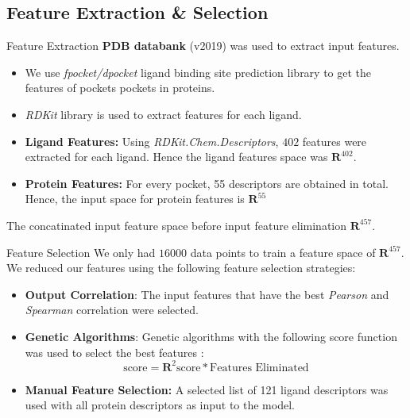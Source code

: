 \documentclass{beamer}
\begin{document}
\subsection{Feature Extraction \& Selection}

\begin{frame}[t]{Feature Extraction}
\textbf{PDB databank} (v2019) was used to extract input features.
\begin{itemize}
\item We use \textit{fpocket/dpocket} ligand binding site prediction library to get the features of pockets pockets in proteins.
\item \textit{RDKit} library is used to extract features for each ligand.
\item \textbf{Ligand Features:} Using \textit{RDKit.Chem.Descriptors}, $402$ features were extracted for each ligand.  Hence the ligand features space was $\mathbf{R}^{402}$.
\item \textbf{Protein Features:} For every pocket,  55 descriptors are obtained in total. Hence, the input space for protein features is $\mathbf{R}^{55}$
\end{itemize}
The concatinated input feature space before input feature elimination $\mathbf{R}^{457}$.

\end{frame}

\begin{frame}[t]{Feature Selection}
We only had $16000$ data points to train a feature space of $\mathbf{R}^{457}$. 
We reduced our features using the following feature selection strategies:
\begin{itemize}
\item \textbf{Output Correlation}: The input features that have the best \textit{Pearson} and \textit{Spearman} correlation were selected.
\item \textbf{Genetic Algorithms}: Genetic algorithms with the following score function was used to select the best features \cite{geneticalgorithmsresearchpaper}:
$$
\textrm{score} = \mathbf{R}^2 \textrm{score} * \textrm{Features Eliminated}
$$
\item \textbf{Manual Feature Selection:} A selected list of 121 ligand descriptors was
used with all protein descriptors as input to the model.
\end{itemize} 
\end{frame}
\end{document}
